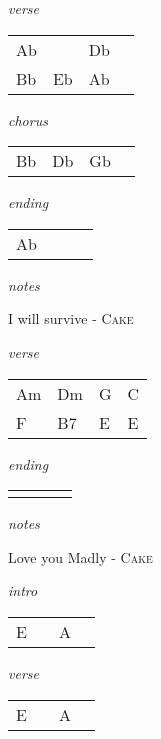 \documentclass[12pt]{article}
\begin{document}
\textit{verse}

\begin{tabular}{|P{1.25in}|P{1.25in}|P{1.25in}|P{1.25in}|}
  Ab &   &  Db &   \\
  Bb  & Eb  & Ab &  \\
\end{tabular}

\textit{chorus}

\begin{tabular}{|P{1.25in}|P{1.25in}|P{1.25in}|P{1.25in}|}
  Bb & Db  & Gb  &   \\
\end{tabular}

\textit{ending}

\begin{tabular}{|P{1.25in}|P{1.25in}|P{1.25in}|P{1.25in}|}
  Ab &   &   &   \\
\end{tabular}

\textit{notes}

\newpage
{\Huge I will survive} {\huge - \textsc{Cake}}

\huge

\textit{verse}

\begin{tabular}{|P{1.25in}|P{1.25in}|P{1.25in}|P{1.25in}|}
  Am  &  Dm  & G  &  C \\
  F   &  B7  & E  &  E \\
\end{tabular}

\textit{ending}

\begin{tabular}{|P{1.25in}|P{1.25in}|P{1.25in}|P{1.25in}|}
    &   &   &   \\
\end{tabular}

\textit{notes}

\newpage

{\Huge Love you Madly} {\huge - \textsc{Cake}}

\huge
\textit{intro}

\begin{tabular}{|P{1.25in}|P{1.25in}|P{1.25in}|P{1.25in}|}
  E &   & A  &   \\
\end{tabular}

\textit{verse}

\begin{tabular}{|P{1.25in}|P{1.25in}|P{1.25in}|P{1.25in}|}
  E &   & A  &   \\
\end{tabular}
\end{document}
